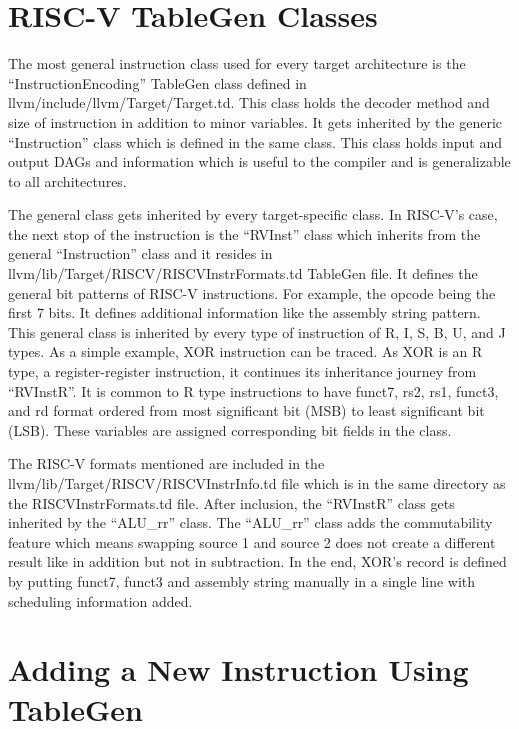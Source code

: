 \section{RISC-V TableGen Classes}
The most general instruction class used for every target architecture is the “InstructionEncoding” TableGen class defined in llvm/include/llvm/Target/Target.td. This class holds the decoder method and size of instruction in addition to minor variables. It gets inherited by the generic “Instruction” class which is defined in the same class. This class holds input and output DAGs and information which is useful to the compiler and is generalizable to all architectures.
\par

The general class gets inherited by every target-specific class. In RISC-V’s case, the next stop of the instruction is the “RVInst” class which inherits from the general “Instruction” class and it resides in llvm/lib/Target/RISCV/RISCVInstrFormats.td TableGen file. It defines the general bit patterns of RISC-V instructions. For example, the opcode being the first 7 bits. It defines additional information like the assembly string pattern. This general class is inherited by every type of instruction of R, I, S, B, U, and J types. As a simple example, XOR instruction can be traced. As XOR is an R type, a register-register instruction, it continues its inheritance journey from “RVInstR”. It is common to R type instructions to have funct7, rs2, rs1, funct3, and rd format ordered from most significant bit (MSB) to least significant bit (LSB). These variables are assigned corresponding bit fields in the class. 
\par

The RISC-V formats mentioned are included in the llvm/lib/Target/RISCV/RISCVInstrInfo.td file which is in the same directory as the RISCVInstrFormats.td file. After inclusion, the “RVInstR” class gets inherited by the “ALU\_rr” class. The “ALU\_rr” class adds the commutability feature which means swapping source 1 and source 2 does not create a different result like in addition but not in subtraction. In the end, XOR’s record is defined by putting funct7, funct3 and assembly string manually in a single line with scheduling information added. 

\pagebreak
\section{Adding a New Instruction Using TableGen}\label{sec:MLA_add_section}

